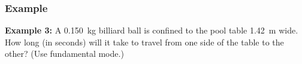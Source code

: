 \documentclass[12pt,compress,aspectratio=169]{beamer}
\begin{document}
\begin{frame}
  \frametitle{Example}
  \textbf{Example 3:} A \SI{.150}{\kilo\gram} billiard ball is confined to the
  pool table \SI{1.42}{\metre} wide. How long (in seconds) will it take to
  travel from one side of the table to the other? (Use fundamental mode.)
\end{frame}
\end{document}
